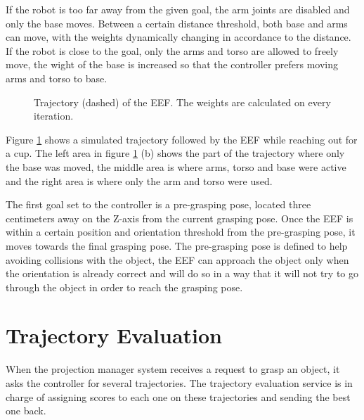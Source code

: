 If the robot is too far away from the given goal, the arm joints are disabled and only the base moves. Between a certain distance threshold, both base and arms can move, with the weights dynamically changing in accordance to the distance. If the robot is close to the goal, only the arms and torso are allowed to freely move, the wight of the base is increased so that the controller prefers moving arms and torso to base.
\begin{figure}[H]
	\centering
	\begin{subfigure}[][Isometric view]
		{\texttt{[image: boxy/Trajectory01.png]}}
	\end{subfigure}
	\begin{subfigure}[][Top view]
		{\texttt{[image: boxy/TrajectoryParts.png]}}
	\end{subfigure}
	\vspace{-10pt}
	\caption[Boxy's Trajectory]{Trajectory (dashed) of the EEF. The weights are calculated on every iteration.}
	\vspace{-15pt}
	\label{fig:traj1}
\end{figure}

Figure \ref{fig:traj1} shows a simulated trajectory followed by the EEF while reaching out for a cup. The left area in figure \ref{fig:traj1} (b) shows the part of the trajectory where only the base was moved, the middle area is where arms, torso and base were active and the right area is where only the arm and torso were used.

The first goal set to the controller is a pre-grasping pose, located three centimeters away on the Z-axis from the current grasping pose. Once the EEF is within a certain position and orientation threshold from the  pre-grasping pose, it moves towards the final grasping pose. The pre-grasping pose is defined to help avoiding collisions with the object, the EEF can approach the object only when the orientation is already correct and will do so in a way that it will not try to go through the object in order to reach the grasping pose.

\section{Trajectory Evaluation}
\label{sec:traj_eval}

When the projection manager system receives a request to grasp an object, it asks the controller for several trajectories. The trajectory evaluation service is in charge of assigning scores to each one on these trajectories and sending the best one back.

